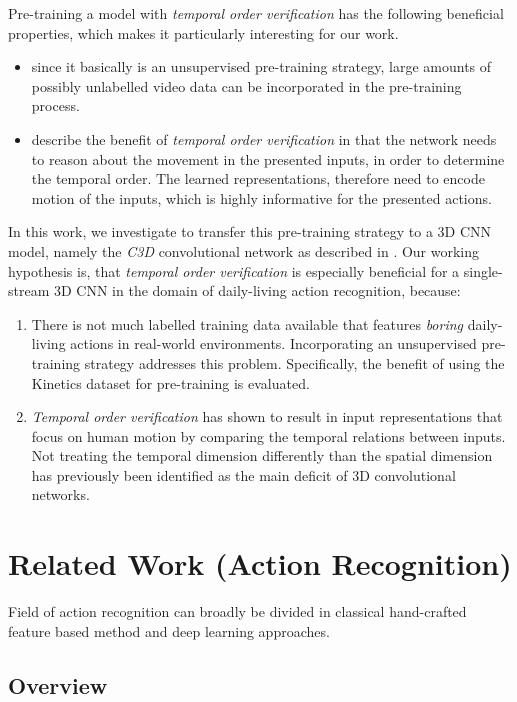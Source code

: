 Pre-training a model with \textit{temporal order verification} has the following beneficial properties, which makes it particularly interesting for our work.
\begin{itemize}
    \item 
    since it basically is an unsupervised pre-training strategy, large amounts of possibly unlabelled video data can be incorporated in the pre-training process.
    \item
    \textcite{misra_shuffle_2016} describe the benefit of \textit{temporal order verification} in that the network needs to reason about the movement in the presented inputs, in order to determine the temporal order.
    The learned representations, therefore need to encode motion of the inputs, which is highly informative for the presented actions.
\end{itemize}

In this work, we investigate to transfer this pre-training strategy to a 3D CNN model, namely the \textit{C3D} convolutional network as described in \cite{tran_learning_2015}.
Our working hypothesis is, that \textit{temporal order verification} is especially beneficial for a single-stream 3D CNN in the domain of daily-living action recognition, because:
\begin{enumerate}
    \item
    There is not much labelled training data available that features \textit{boring} daily-living actions in real-world environments.
    Incorporating an unsupervised pre-training strategy addresses this problem.
    Specifically, the benefit of using the Kinetics dataset for pre-training is evaluated.
    \item 
    \textit{Temporal order verification} has shown to result in input representations that focus on human motion by comparing the temporal relations between inputs.
    Not treating the temporal dimension differently than the spatial dimension has previously been identified as the main deficit of 3D convolutional networks.
\end{enumerate}


\section{Related Work (Action Recognition)}

Field of action recognition can broadly be divided in classical hand-crafted feature based method and deep learning approaches.


\subsection{Overview}

